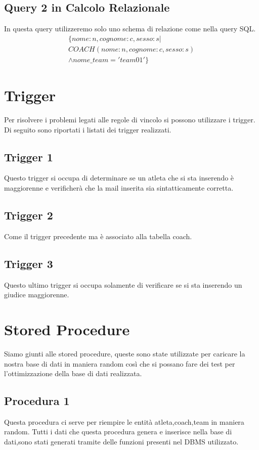 \documentclass[12pt,a4paper]{article}
\begin{document}
\subsection{Query 2 in Calcolo Relazionale}
In questa query utilizzeremo solo uno schema di relazione come nella query SQL.
\begin{equation}
\begin{split}
\{nome:n,cognome:c,sesso:s | \\ COACH(nome:n,cognome:c,sesso:s) \\ \land nome\_team='team01'\}
\end{split}
\end{equation}
\newpage
\section{Trigger}
Per risolvere i problemi legati alle regole di vincolo si possono utilizzare i trigger. Di seguito sono riportati i listati dei trigger realizzati.
\subsection{Trigger 1}
Questo trigger si occupa di determinare se un atleta che si sta inserendo è maggiorenne e verificherà che la mail inserita sia sintatticamente corretta.

\subsection{Trigger 2}
Come il trigger precedente ma è associato alla tabella coach.

\subsection{Trigger 3}
Questo ultimo trigger si occupa solamente di verificare se si sta inserendo un giudice maggiorenne.


\section{Stored Procedure}
Siamo giunti alle stored procedure, queste sono state utilizzate per caricare la nostra base di dati in maniera random così che si possano fare dei test per l'ottimizzazione della base di dati realizzata.
\subsection{Procedura 1}
Questa procedura ci serve per riempire le entità atleta,coach,team in maniera random. Tutti i dati che questa procedura genera e inserisce nella base di dati,sono stati generati tramite delle funzioni presenti nel DBMS utilizzato.

\end{document}
